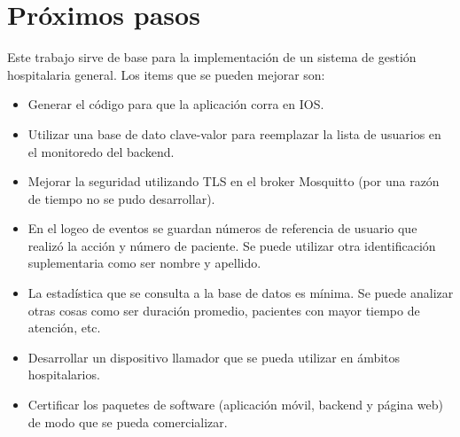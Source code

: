 \section{Próximos pasos}


Este trabajo sirve de base para la implementación de un sistema de gestión hospitalaria general. Los items que se pueden mejorar son:

\begin{itemize}
\item Generar el código para que la aplicación corra en IOS.
\item Utilizar una base de dato clave-valor para reemplazar la lista de usuarios en el monitoredo del backend.
\item Mejorar la seguridad utilizando TLS en el broker Mosquitto (por una razón de tiempo no se pudo desarrollar).
\item En el logeo de eventos se guardan números de referencia de usuario que realizó la acción y número de paciente. Se puede utilizar otra identificación suplementaria como ser nombre y apellido.
\item La estadística que se consulta a la base de datos es mínima. Se puede analizar otras cosas como ser duración promedio, pacientes con mayor tiempo de atención, etc.
\item Desarrollar un dispositivo llamador que se pueda utilizar en ámbitos hospitalarios.
\item Certificar los paquetes de software (aplicación móvil, backend y página web) de modo que se pueda comercializar.

\end{itemize}
